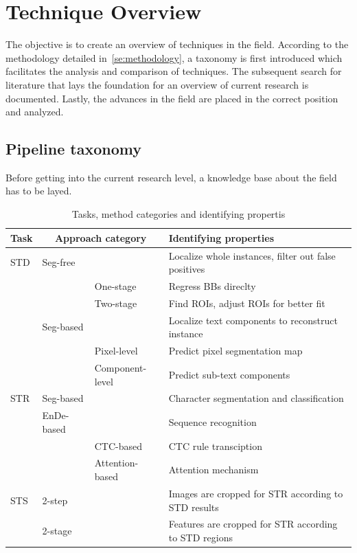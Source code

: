 \chapter{Technique Overview}\label{ch:research}
The objective is to create an overview of techniques in the field.
According to the methodology detailed in~\ref{se:methodology}, a taxonomy is first introduced
which facilitates the analysis and comparison of techniques.
The subsequent search for literature that lays the foundation for an overview of current research
is documented.
Lastly, the advances in the field are placed in the correct position and analyzed.

\section{Pipeline taxonomy}\label{se:taxonomy}
Before getting into the current research level, a knowledge base about the field has to be layed.
\begin{table}[h]
    \centering\scriptsize
    \begin{tabular}{p{}p{}p{}p{}}
        \textbf{Task} & \multicolumn{2}{c}{\textbf{Approach category}}
                      & \textbf{Identifying properties} \\
        \toprule
        STD & Seg-free & & Localize whole instances, filter out false positives \\
            & & One-stage & Regress BBs direclty \\
            & & Two-stage & Find ROIs, adjust ROIs for better fit \\
            & Seg-based & & Localize text components to reconstruct instance \\
            & & Pixel-level & Predict pixel segmentation map\\
            & & Component-level & Predict sub-text components \\
        \midrule
        STR & Seg-based & & Character segmentation and classification\\
            & EnDe-based & & Sequence recognition \\
            & & CTC-based & CTC rule transciption \\
            & & Attention-based & Attention mechanism \\
        \midrule
        STS & 2-step & & Images are cropped for STR according to STD results \\
            & 2-stage & & Features are cropped for STR according to STD regions \\
        \bottomrule
    \end{tabular}
    \caption{Tasks, method categories and identifying propertis\label{tb:steps-properties}}
\end{table}
